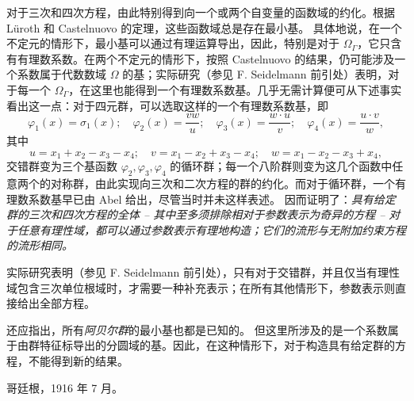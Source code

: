 对于三次和四次方程，由此特别得到向一个或两个自变量的函数域的约化。根据 Lüroth 和 Castelnuovo 的定理，这些函数域总是存在最小基。 具体地说，在一个不定元的情形下，最小基可以通过有理运算导出，因此，特别是对于 $\Omega_\Gamma$，它只含有有理数系数。在两个不定元的情形下，按照 Castelnuovo 的结果，仍可能涉及一个系数属于代数数域 $\Omega$ 的基；实际研究（参见 F. Seidelmann 前引处）表明，对于每一个 $\Omega_\Gamma$，在这里也能得到一个有理数系数基。几乎无需计算便可从下述事实看出这一点：对于四元群，可以选取这样的一个有理数系数基，即
\[
\varphi_1(x)=\sigma_1(x);\quad \varphi_2(x)=\frac{v w}{u};\quad \varphi_3(x)=\frac{w\cdot u}{v};\quad \varphi_4(x)=\frac{u\cdot v}{w},
\]
其中
\[
u=x_1+x_2-x_3-x_4;\quad v=x_1-x_2+x_3-x_4;\quad w=x_1-x_2-x_3+x_4,
\]
交错群变为三个基函数 $\varphi_2,\varphi_3,\varphi_4$ 的循环群；每一个八阶群则变为这几个函数中任意两个的对称群，由此实现向三次和二次方程的群的约化。而对于循环群，一个有理数系数基早已由 Abel 给出，尽管当时并未这样表述。 因而证明了：\emph{具有给定群的三次和四次方程的全体 -- 其中至多须排除相对于参数表示为奇异的方程 -- 对于任意有理性域，都可以通过参数表示有理地构造；它们的流形与无附加约束方程的流形相同。}

实际研究表明（参见 F. Seidelmann 前引处），只有对于交错群，并且仅当有理性域包含三次单位根域时，才需要一种补充表示；在所有其他情形下，参数表示则直接给出全部方程。

还应指出，所有\emph{阿贝尔群}的最小基也都是已知的。 但这里所涉及的是一个系数属于由群特征标导出的分圆域的基。因此，在这种情形下，对于构造具有给定群的方程，不能得到新的结果。

哥廷根，1916 年 7 月。

\clearpage
\setcounter{footnote}{0}
\providecommand{\bdelta}{\bar{\delta}}
